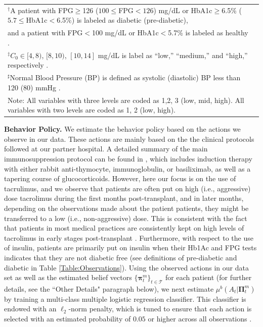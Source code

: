 \documentclass[opre,nonblindrev]{informs2}%
\newcommand{\1}{\hbox{\rm 1\kern-.35em 1}}
\newcommand{\MT}{\mathscr T}
\newcommand{\bpi}{\boldsymbol{\pi}}
\newcommand{\bPi}{\boldsymbol{\Pi}}
\begin{document}
{\begin{table}[t]
\begin{center}
{\begin{tabular}{clccccc}
\hline
\multicolumn{6}{l}{$^\dag$\normalfont A patient with FPG$\geq$126 ($100\leq$FPG$<126$) mg/dL or HbA1c$\geq$6.5\% ($5.7\leq$HbA1c$<$6.5\%) is labeled as diabetic (pre-diabetic),}\\
 \multicolumn{6}{l}{and a patient with FPG$<$100 mg/dL or HbA1c$<$5.7\% is labeled as healthy \citep[see, e.g.,][]{ada2012}.}\\
\multicolumn{6}{l}{$^\ddag$\normalfont $C_0 \in [4,8)$, $[8,10)$, $[10,14]$ mg/dL is label as ``low,'' ``medium,'' and ``high,'' respectively \citep[see, e.g.,][]{Boloori2020}.}\\
\multicolumn{6}{l}{$^\sharp$\normalfont Normal Blood Pressure (BP) is defined as systolic (diastolic) BP less than 120 (80) mmHg \citep[see, e.g.,][]{Whelton2018}.}\\
\multicolumn{6}{l}{\normalfont Note: All variables with three levels are coded as 1,2, 3 (low, mid, high). All variables with two levels are coded as 1, 2 (low,  high).}\\
			\end{tabular}}

				
		\end{center}
		\vspace{-10pt}
	\end{table}
}



\noindent\textbf{Behavior Policy.} We estimate the behavior policy based on the actions we observe in our data. These actions are mainly based on the the clinical protocols followed at our partner hospital. A detailed summary of the main immunosuppression protocol can be found in \citep{Munshi2021}, which includes induction therapy with
either rabbit anti-thymocyte, immunoglobulin, or basiliximab, as well as a tapering course of glucocorticoids. However, here our focus  is on the use of tacrulimus, and we observe that  patients are often put on high (i.e., aggressive) dose tacrolimus during the first months post-transplant, and in later months, depending on the observations made about the patient patients, they might be transferred to a  low (i.e., non-aggressive) dose.  This is consistent with the fact that patients in most medical practices are consistently kept on high levels of tacrolimus
in early stages post-transplant  \citep[see, e.g., ][]{Ghisdal2012, Boloori2020}. Furthermore, with respect to the use of insulin,  patients are primarily put on insulin when their Hb1Ac and FPG tests indicates that they are not diabetic free (see definitions of pre-diabetic and diabetic in Table \ref{Table:Observations}). Using the observed actions in our data set as well as the estimated belief vectors $\{\bpi_t^m\}_{t\in\MT}$ for each patient (for further details, see the ``Other Details" paragraph below),  we next estimate $\mu^b(A_t|\bPi^m_t)$ by training  a multi-class  multiple logistic regression classifier. This classifier  is endowed with an $\ell_2$-norm penalty, which is tuned to ensure that each action is selected with an estimated probability of $0.05$ or higher across all observations \citep[see, e.g., ][]{Murphy2016}.
\end{document}
